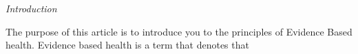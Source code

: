 \textit{Introduction}

The purpose of this article is to introduce you to the principles of Evidence Based health. Evidence based health is a term that denotes that 
